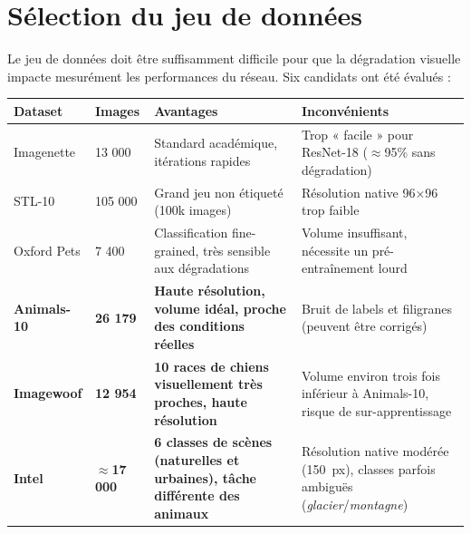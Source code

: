 \documentclass[11pt,a4paper,openany]{book}
\newcommand{\tableheadcolor}{\rowcolor{headerbg}}
\newcommand{\tablerowodd}{}
\begin{document}
\section{Sélection du jeu de données}

Le jeu de données doit être suffisamment difficile pour que la dégradation visuelle impacte mesurément les performances du réseau. Six candidats ont été évalués :

\vspace{0.8em}
\renewcommand{\arraystretch}{1.5}
\begin{tabularx}{\linewidth}{C{2.4cm} C{1.6cm} L{5.5cm} L{5.8cm}}
  \toprule
  \tableheadcolor
  \textbf{Dataset} &
  \textbf{Images} &
  \textbf{Avantages} &
  \textbf{Inconvénients} \\
  \midrule
  \tablerowodd
  Imagenette & 13 000 & Standard académique, itérations rapides & Trop « facile » pour ResNet-18 ($\approx$95\% sans dégradation) \\
  STL-10 & 105 000 & Grand jeu non étiqueté (100k images) & Résolution native 96$\times$96 trop faible \\
  \tablerowodd
  Oxford Pets & 7 400 & Classification fine-grained, très sensible aux dégradations & Volume insuffisant, nécessite un pré-entraînement lourd \\
  \textbf{Animals-10} & \textbf{26 179} & \textbf{Haute résolution, volume idéal, proche des conditions réelles} & Bruit de labels et filigranes (peuvent être corrigés) \\
  \tablerowodd
  \textbf{Imagewoof} & \textbf{12 954} & \textbf{10 races de chiens visuellement très proches, haute résolution} & Volume environ trois fois inférieur à Animals-10, risque de sur-apprentissage \\
  \tablerowodd
  \textbf{Intel} & \textbf{$\approx$17 000} & \textbf{6 classes de scènes (naturelles et urbaines), tâche différente des animaux} & Résolution native modérée (150~px), classes parfois ambiguës (\textit{glacier}/\textit{montagne}) \\
  \bottomrule
\end{tabularx}
\end{document}

